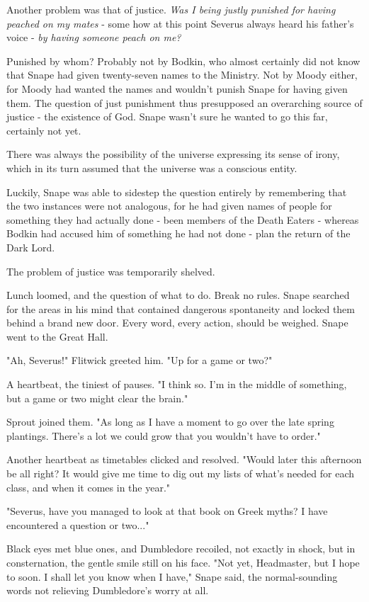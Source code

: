 \documentclass[a4paper,11pt]{article}
\begin{document}
Another problem was that of justice. \emph{Was I being justly punished for having peached on my mates} - some how at this point Severus always heard his father's voice - \emph{by having someone peach on me?}

Punished by whom? Probably not by Bodkin, who almost certainly did not know that Snape had given twenty-seven names to the Ministry. Not by Moody either, for Moody had wanted the names and wouldn't punish Snape for having given them. The question of just punishment thus presupposed an overarching source of justice - the existence of God. Snape wasn't sure he wanted to go this far, certainly not yet.

There was always the possibility of the universe expressing its sense of irony, which in its turn assumed that the universe was a conscious entity.

Luckily, Snape was able to sidestep the question entirely by remembering that the two instances were not analogous, for he had given names of people for something they had actually done - been members of the Death Eaters - whereas Bodkin had accused him of something he had not done - plan the return of the Dark Lord.

The problem of justice was temporarily shelved.

Lunch loomed, and the question of what to do. Break no rules. Snape searched for the areas in his mind that contained dangerous spontaneity and locked them behind a brand new door. Every word, every action, should be weighed. Snape went to the Great Hall.

"Ah, Severus!" Flitwick greeted him. "Up for a game or two?"

A heartbeat, the tiniest of pauses. "I think so. I'm in the middle of something, but a game or two might clear the brain."

Sprout joined them. "As long as I have a moment to go over the late spring plantings. There's a lot we could grow that you wouldn't have to order."

Another heartbeat as timetables clicked and resolved. "Would later this afternoon be all right? It would give me time to dig out my lists of what's needed for each class, and when it comes in the year."

"Severus, have you managed to look at that book on Greek myths? I have encountered a question or two..."

Black eyes met blue ones, and Dumbledore recoiled, not exactly in shock, but in consternation, the gentle smile still on his face. "Not yet, Headmaster, but I hope to soon. I shall let you know when I have," Snape said, the normal-sounding words not relieving Dumbledore's worry at all.
\end{document}
